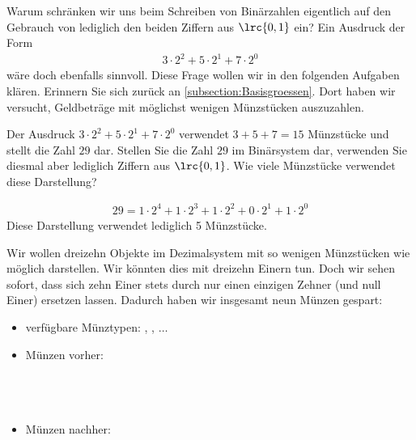 Warum schränken wir uns beim Schreiben von Binärzahlen eigentlich auf den Gebrauch von lediglich den beiden Ziffern aus
$\lrc{0,1}$ ein? Ein Ausdruck der Form
\begin{align*}
	3\cdot 2^2 + 5\cdot 2^1 + 7\cdot 2^0
\end{align*}
wäre doch ebenfalls sinnvoll. Diese Frage wollen wir in den folgenden Aufgaben klären. Erinnern Sie sich zurück an \cref{subsection:Basisgroessen}.
Dort haben wir versucht, Geldbeträge mit möglichst wenigen Münzstücken auszuzahlen.

\begin{myexercise}
	Der Ausdruck $3\cdot 2^2 + 5\cdot 2^1 + 7\cdot 2^0$ verwendet $3+5+7 = 15$ Münzstücke und stellt die Zahl $29$ dar.
	Stellen Sie die Zahl $29$ im Binärsystem dar, verwenden Sie diesmal aber lediglich Ziffern aus $\lrc{0,1}$. Wie viele
	Münzstücke verwendet diese Darstellung?
	\begin{myanswer}
		\begin{align*}
			29 = 1\cdot 2^4 + 1\cdot 2^3 + 1\cdot 2^2 + 0\cdot 2^1 + 1\cdot 2^0
		\end{align*}
		Diese Darstellung verwendet lediglich 5 Münzstücke.
	\end{myanswer}
\end{myexercise}

\begin{myexample}\label{myexample:ersetzen}
Wir wollen dreizehn Objekte im Dezimalsystem mit so wenigen Münzstücken wie möglich darstellen. Wir könnten dies mit
dreizehn Einern tun. Doch wir sehen sofort, dass sich zehn Einer stets durch nur einen einzigen Zehner (und null
Einer) ersetzen lassen. Dadurch haben wir insgesamt neun Münzen gespart:
\begin{itemize}
	\item verfügbare Münztypen: , , $\ldots$
	\item Münzen vorher:\\
	      \\
	      \\
	      \\
	\item Münzen nachher:\\
	      \\
\end{itemize}
\end{myexample}

